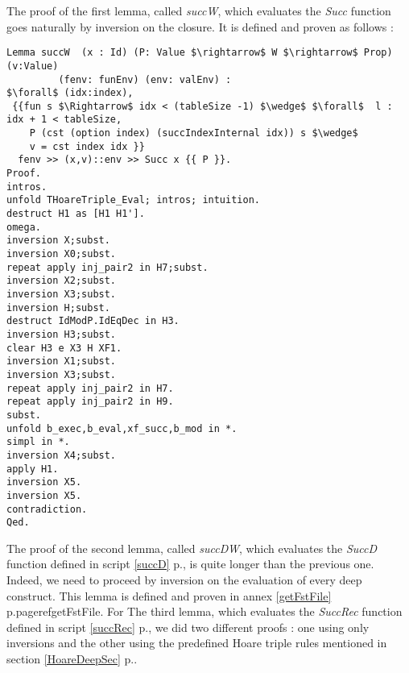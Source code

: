 \noindent The proof of the first lemma, called \textit{succW}, which evaluates the \textit{Succ} function goes naturally by inversion on the closure. It is defined and proven as follows :
\begin{lstlisting}[caption = {succW Lemma definition and proof}, xleftmargin=-.05\textwidth,
xrightmargin=-.05\textwidth,mathescape=true]
Lemma succW  (x : Id) (P: Value $\rightarrow$ W $\rightarrow$ Prop) (v:Value) 
	     (fenv: funEnv) (env: valEnv) :
$\forall$ (idx:index),
 {{fun s $\Rightarrow$ idx < (tableSize -1) $\wedge$ $\forall$  l : idx + 1 < tableSize, 
    P (cst (option index) (succIndexInternal idx)) s $\wedge$
    v = cst index idx }}  
  fenv >> (x,v)::env >> Succ x {{ P }}.
Proof.
intros.
unfold THoareTriple_Eval; intros; intuition.
destruct H1 as [H1 H1'].
omega.
inversion X;subst.
inversion X0;subst.
repeat apply inj_pair2 in H7;subst.
inversion X2;subst.
inversion X3;subst.
inversion H;subst.
destruct IdModP.IdEqDec in H3.
inversion H3;subst.
clear H3 e X3 H XF1.
inversion X1;subst.
inversion X3;subst.
repeat apply inj_pair2 in H7.
repeat apply inj_pair2 in H9.
subst.
unfold b_exec,b_eval,xf_succ,b_mod in *.
simpl in *.
inversion X4;subst.
apply H1.
inversion X5.
inversion X5.
contradiction.
Qed.
\end{lstlisting} \vspace{4pt}

The proof of the second lemma, called \textit{succDW}, which evaluates the \textit{SuccD} function defined in script \ref{succD} p.\pageref{succD}, is quite longer than the previous one. Indeed, we need to proceed by inversion on the evaluation of every deep construct. This lemma is defined and proven in annex \ref{getFstFile} p.pageref{getFstFile}.    
For The third lemma, which evaluates the \textit{SuccRec} function defined in script \ref{succRec} p.\pageref{succRec}, we did two different proofs : one using only inversions and the other using the predefined Hoare triple rules mentioned in section \ref{HoareDeepSec} p.\pageref{HoareDeepSec}. \\

